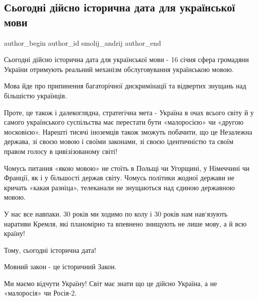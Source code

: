  
 
 
 
 
\subsection{Сьогодні дійсно історична дата для української мови}
\label{sec:16_01_2021.fb.smolii_andrii.1.zakon_pro_movu}
\ifcmt
  author_begin
   author_id smolij_andrij
  author_end
\fi

Сьогодні дійсно історична дата для української мови - 16 січня сфера громадяни
України отримують реальний механізм обслуговування українською мовою. 

Мова йде про припинення багаторічної дискримінації та відвертих знущань над
більшістю українців.


Проте, це також і далекоглядна, стратегічна мета - Україна в очах всього світу
й у самого українського суспільства має перестати бути «малоросією» чи «другою
московією». Нарешті тисячі іноземців також зможуть побачити, що це Незалежна
держава, зі своєю мовою і своїми законами, зі своєю ідентичністю та своїм
правом голосу в цивізізованому світі! 

Чомусь питання «якою мовою» не стоїть в Польщі чи Угорщині, у Німеччині чи
Франції, як і у більшості держав світу. Чомусь політики жодної держави не
кричать «какая разніца», телеканали не знущаються над єдиною державною мовою. 

У нас все навпаки. 30 років ми ходимо по колу і 30 років нам нав‘язують
наративи Кремля, які планомірно та впевнено знищують не лише мову, а й всю
країну! 

Тому, сьогодні історична дата! 

Мовний закон - це історичний Закон. 

Ми маємо відчути Україну! Світ має знати що це дійсно Україна, а не «малоросія»
чи Росія-2.



